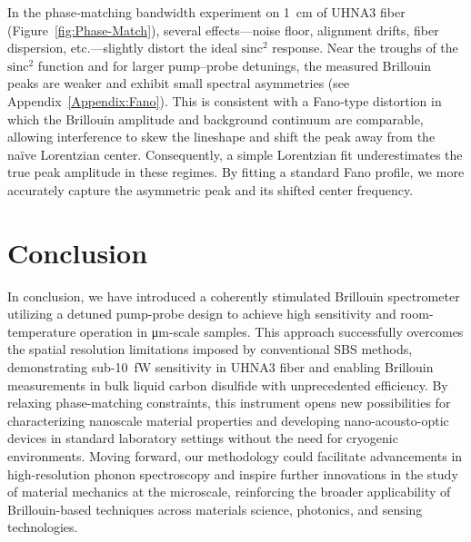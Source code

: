 In the phase‐matching bandwidth experiment on \SI{1}{\centi\meter} of \ac{UHNA3} fiber (Figure~\ref{fig:Phase-Match}), several effects—noise floor, alignment drifts, fiber dispersion, etc.—slightly distort the ideal \(\mathrm{sinc^{2}}\) response. Near the troughs of the \(\mathrm{sinc^{2}}\) function and for larger pump–probe detunings, the measured Brillouin peaks are weaker and exhibit small spectral asymmetries (see Appendix~\ref{Appendix:Fano}). This is consistent with a Fano‐type distortion in which the Brillouin amplitude and background continuum are comparable, allowing interference to skew the lineshape and shift the peak away from the naïve Lorentzian center. Consequently, a simple Lorentzian fit underestimates the true peak amplitude in these regimes. By fitting a standard Fano profile, we more accurately capture the asymmetric peak and its shifted center frequency.

\section{Conclusion}
\label{Conclusion}

In conclusion, we have introduced a coherently stimulated Brillouin spectrometer utilizing a detuned pump-probe design to achieve high sensitivity and room-temperature operation in \si{\micro\meter}-scale samples. This approach successfully overcomes the spatial resolution limitations imposed by conventional \ac{SBS} methods, demonstrating sub-\SI{10}{\femto\watt} sensitivity in \ac{UHNA3} fiber and enabling Brillouin measurements in bulk liquid carbon disulfide with unprecedented efficiency. By relaxing phase-matching constraints, this instrument opens new possibilities for characterizing nanoscale material properties and developing nano-acousto-optic devices in standard laboratory settings without the need for cryogenic environments. Moving forward, our methodology could facilitate advancements in high-resolution phonon spectroscopy and inspire further innovations in the study of material mechanics at the microscale, reinforcing the broader applicability of Brillouin-based techniques across materials science, photonics, and sensing technologies.

\clearpage
\thispagestyle{empty}
\null
\newpage
